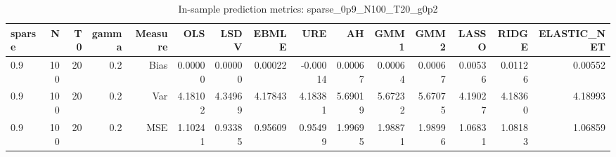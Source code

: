\begin{table}[!htbp]\centering
\caption{In-sample prediction metrics: sparse_0p9_N100_T20_g0p2}
\label{tab:table2_sparse_0p9_N100_T20_g0p2}
\begin{tabular}{lrrrrrrrrrrrrrr}
\hline
sparse & N & T0 & gamma & Measure & OLS & LSDV & EBMLE & URE & AH & GMM1 & GMM2 & LASSO & RIDGE & ELASTIC_NET \\
\hline
0.9 & 100 & 20 & 0.2 & Bias & 0.00000 & 0.00000 & 0.00022 & -0.00014 & 0.00067 & 0.00064 & 0.00067 & 0.00536 & 0.01126 & 0.00552 \\
0.9 & 100 & 20 & 0.2 & Var & 4.18102 & 4.34969 & 4.17843 & 4.18381 & 5.69019 & 5.67232 & 5.67075 & 4.19027 & 4.18360 & 4.18993 \\
0.9 & 100 & 20 & 0.2 & MSE & 1.10241 & 0.93385 & 0.95609 & 0.95499 & 1.99695 & 1.98871 & 1.98996 & 1.06831 & 1.08183 & 1.06859 \\
\hline
\end{tabular}
\end{table}


